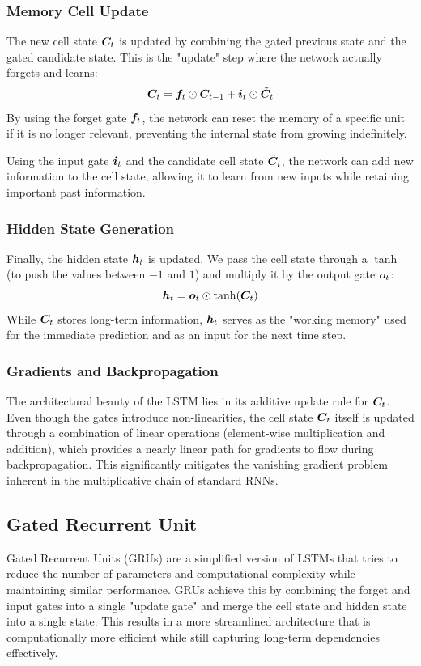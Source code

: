 \subsubsection{Memory Cell Update}
The new cell state $\boldsymbol{C}_t$ is updated by combining the gated previous state and the gated candidate state.
This is the "update" step where the network actually forgets and learns:
\begin{equation}
    \boldsymbol{C}_t = \boldsymbol{f}_t \odot \boldsymbol{C}_{t-1} + \boldsymbol{i}_t \odot \tilde{\boldsymbol{C}}_t
\end{equation}
By using the forget gate $\boldsymbol{f}_t$, the network can reset the memory of a specific unit if it is no longer relevant, preventing the internal state from growing indefinitely.

Using the input gate $\boldsymbol{i}_t$ and the candidate cell state $\tilde{\boldsymbol{C}}_t$, the network can add new information to the cell state, allowing it to learn from new inputs while retaining important past information.

\subsubsection{Hidden State Generation}
Finally, the hidden state $\boldsymbol{h}_t$ is updated.
We pass the cell state through a $\tanh$ (to push the values between $-1$ and $1$) and multiply it by the output gate $\boldsymbol{o}_t$:
\begin{equation}
    \boldsymbol{h}_t = \boldsymbol{o}_t \odot \tanh(\boldsymbol{C}_t)
\end{equation}
While $\boldsymbol{C}_t$ stores long-term information, $\boldsymbol{h}_t$ serves as the "working memory" used for the immediate prediction and as an input for the next time step.

\subsubsection{Gradients and Backpropagation}
The architectural beauty of the LSTM lies in its additive update rule for $\boldsymbol{C}_t$.
Even though the gates introduce non-linearities, the cell state $\boldsymbol{C}_t$ itself is updated through a combination of linear operations (element-wise multiplication and addition),
which provides a nearly linear path for gradients to flow during backpropagation.
This significantly mitigates the vanishing gradient problem inherent in the multiplicative chain of standard RNNs.

\subsection{Gated Recurrent Unit}
Gated Recurrent Units (GRUs) are a simplified version of LSTMs that tries to reduce the number of parameters and computational complexity while maintaining similar performance.
GRUs achieve this by combining the forget and input gates into a single "update gate" and merge the cell state and hidden state into a single state.
This results in a more streamlined architecture that is computationally more efficient while still capturing long-term dependencies effectively.

